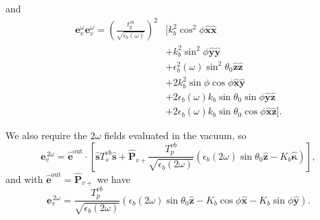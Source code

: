 and
\begin{equation*}
\begin{split}
\mathbf{e}^{\omega}_{v}\mathbf{e}^{\omega}_{v} =
\left(\frac{t^{v b}_{p}}{\sqrt{\epsilon_{b}(\omega)}}\right)^{2}
&\big[
   k^{2}_{b}\cos^{2}\phi\hat{\mathbf{x}}\hat{\mathbf{x}}\\
&+ k^{2}_{b}\sin^{2}\phi\hat{\mathbf{y}}\hat{\mathbf{y}}\\
&+ \epsilon^{2}_{b}(\omega)\sin^{2}\theta_{0}
   \hat{\mathbf{z}}\hat{\mathbf{z}}\\
&+ 2k^{2}_{b}\sin\phi\cos\phi\hat{\mathbf{x}}\hat{\mathbf{y}}\\
&+ 2\epsilon_{b}(\omega)k_{b}\sin\theta_{0}\sin\phi
   \hat{\mathbf{y}}\hat{\mathbf{z}}\\
&+ 2\epsilon_{b}(\omega)k_{b}\sin\theta_{0}\cos\phi
   \hat{\mathbf{x}}\hat{\mathbf{z}}
\big].
\end{split}
\end{equation*}

We also require the $2\omega$ fields evaluated in the vacuum, so
\begin{equation}
\mathbf{e}^{\,2\omega}_{v} = \hat{\mathbf{e}}^{\mathrm{out}}
\cdot\left[
\hat{\mathbf{s}}T_s^{v b}\hat{\mathbf{s}} + \hat{\mathbf{P}}_{v+}
\frac{T^{v b}_{p}}{\sqrt{\epsilon_{b}(2\omega)}}
\left(
  \epsilon_{b}(2\omega)\sin\theta_{0}\hat{\mathbf{z}}
  - K_{b}\hat{\boldsymbol{\kappa}}
\right) 
\right],
\end{equation}
and with $\hat{\mathbf{e}}^{\mathrm{out}} = \hat{\mathbf{P}}_{v+}$ we have
\begin{equation}
\mathbf{e}^{\,2\omega}_{v} =
\frac{T^{v b}_{p}}{\sqrt{\epsilon_{b}(2\omega)}}
\left(
\epsilon_{b}(2\omega)\sin\theta_{0}\hat{\mathbf{z}}
- K_{b}\cos\phi\hat{\mathbf{x}}
- K_{b}\sin\phi\hat{\mathbf{y}}
\right).
\end{equation}

